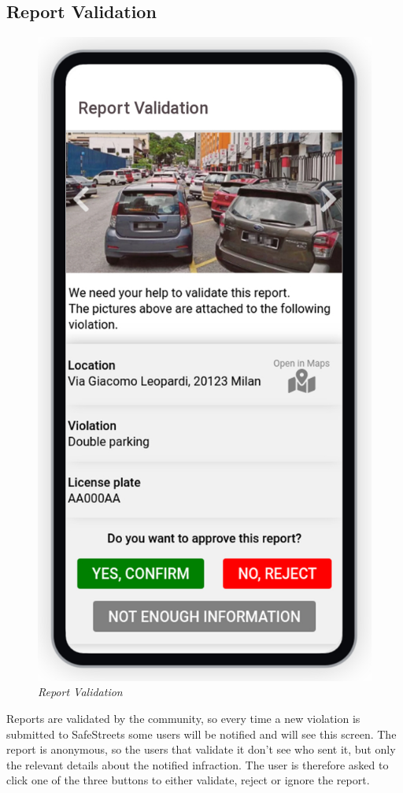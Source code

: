 \subsection{Report Validation}
\begin{figure}[H]
  \centering
  \includegraphics[origin=c,width=\textwidth,height=.90\textheight,keepaspectratio]{DD_Images/UserInterface/Validation.jpg}
  \caption{\textit{Report Validation}}
\end{figure}

Reports are validated by the community, so every time a new violation is submitted to SafeStreets some users will be notified and will see this screen.
The report is anonymous, so the users that validate it don't see who sent it, but only the relevant details about the notified infraction. 
The user is therefore asked to click one of the three buttons to either validate, reject or ignore the report.